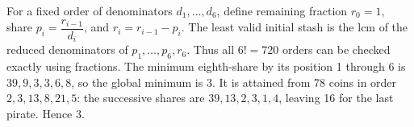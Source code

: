 For a fixed order of denominators $d_1,\ldots,d_6$, define remaining fraction $r_0=1$, share $p_i = \dfrac{r_{i-1}}{d_i}$, and $r_i=r_{i-1}-p_i$. The least valid initial stash is the lcm of the reduced denominators of $p_1,\ldots,p_6,r_6$. Thus all $6!=720$ orders can be checked exactly using fractions. The minimum eighth-share by its position 1 through 6 is $39,9,3,3,6,8$, so the global minimum is 3. It is attained from 78 coins in order $2,3,13,8,21,5$: the successive shares are $39,13,2,3,1,4$, leaving 16 for the last pirate. Hence $\boxed3$.
